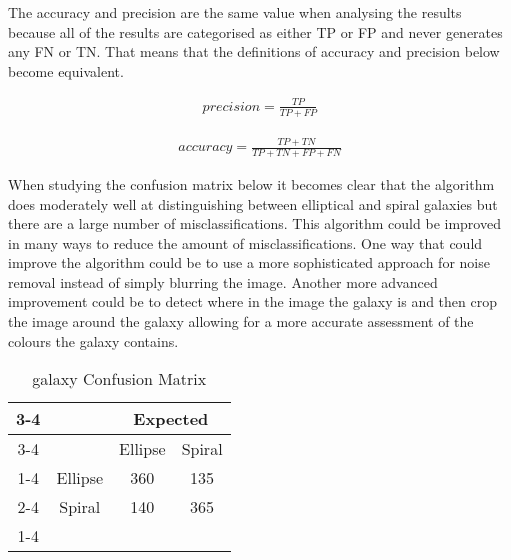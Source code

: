 \documentclass{article}
\begin{document}
The accuracy and precision are the same value when analysing the results because all of the results are categorised as either TP or FP and never generates any FN or TN. That means that the definitions of accuracy and precision below become equivalent. 

\begin{equation}
\begin{split}
precision = \frac{TP}{TP+FP}
\end{split}
\end{equation}

\begin{equation}
\begin{split}
accuracy = \frac{TP+TN}{TP+TN+FP+FN}
\end{split}
\end{equation}

When studying the confusion matrix below it becomes clear that the algorithm does moderately well at distinguishing between elliptical and spiral galaxies but there are a large number of misclassifications. This algorithm could be improved in many ways to reduce the amount of misclassifications. One way that could improve the algorithm could be to use a more sophisticated approach for noise removal instead of simply blurring the image. Another more advanced improvement could be to detect where in the image the galaxy is and then crop the image around the galaxy allowing for a more accurate assessment of the colours the galaxy contains.

\begin{table}[h]
\caption{galaxy Confusion Matrix}
\centering
\begin{tabular}{cc|c|c|}
	\cline{3-4}
	& & \multicolumn{2}{c|}{Expected} \\ \cline{3-4}
	& & Ellipse & Spiral \\ \cline{1-4}
	\multicolumn{1}{|c|}{\multirow{2}{*}{Actual}} & 
	Ellipse & 360 & 135 \\ \cline{2-4}
	\multicolumn{1}{ |c }{} &
   \multicolumn{1}{|c|}{Spiral} & 140 & 365 \\ \cline{1-4}
\end{tabular}
\end{table}
\end{document}

